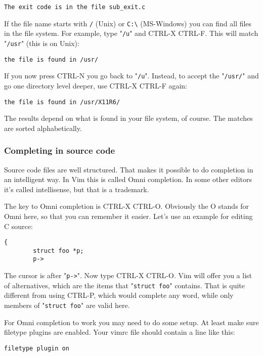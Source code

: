 \begin{Verbatim}[samepage=true]
    The exit code is in the file sub_exit.c 
\end{Verbatim}

If the file name starts with \verb!/! (Unix) or \verb!C:\! (MS-Windows) you can find all files in the file system.
For example, type "\verb!/u!" and CTRL-X CTRL-F.
This will match "\verb!/usr!" (this is on Unix):

\begin{Verbatim}[samepage=true]
    the file is found in /usr/ 
\end{Verbatim}

If you now press CTRL-N you go back to "\verb!/u!".
Instead, to accept the "\verb!/usr/!" and go one directory level deeper, use CTRL-X CTRL-F again:

\begin{Verbatim}[samepage=true]
    the file is found in /usr/X11R6/ 
\end{Verbatim}

The results depend on what is found in your file system, of course.
The matches are sorted alphabetically.
\subsubsection{Completing in source code}
Source code files are well structured.
That makes it possible to do completion in an intelligent way.
In Vim this is called Omni completion.
In some other editors it's called intellisense, but that is a trademark.

The key to Omni completion is CTRL-X CTRL-O.
Obviously the O stands for Omni here, so that you can remember it easier.
Let's use an example for editing C source:

\begin{Verbatim}[samepage=true]
    { 
        struct foo *p; 
        p-> 
\end{Verbatim}

The cursor is after "\verb!p->!".
Now type CTRL-X CTRL-O.
Vim will offer you a list of alternatives, which are the items that "\verb!struct foo!" contains.
That is quite different from using CTRL-P, which would complete any word, while only members of "\verb!struct foo!" are valid here.

For Omni completion to work you may need to do some setup.
At least make sure filetype plugins are enabled.
Your vimrc file should contain a line like this:

\begin{Verbatim}[samepage=true]
 filetype plugin on
\end{Verbatim}
 
